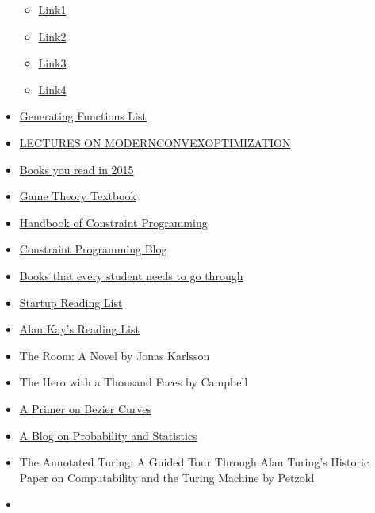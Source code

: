 \begin{itemize}
  \begin{itemize}
  \item
    \href{http://bartoszmilewski.com/2015/05/11/using-monads-in-c-to-solve-constraints-1-the-list-monad/}{Link1}
  \item
    \href{http://blog.jle.im/entry/unique-sample-drawing-searches-with-list-and-statet}{Link2}
  \item
    \href{http://www.berniepope.id.au/docs/scala_monads.pdf}{Link3}
  \item
    \href{http://james-iry.blogspot.co.at/2007/10/monads-are-elephants-part-3.html}{Link4}
  \end{itemize}
\item
  \href{http://lacim.uqam.ca/~plouffe/articles/MasterThesis.pdf}{Generating
  Functions List}
\item
  \href{http://www2.isye.gatech.edu/~nemirovs/Lect_ModConvOpt.pdf}{LECTURES
  ON MODERNCONVEXOPTIMIZATION}
\item
  \href{https://news.ycombinator.com/item?id=10783219}{Books you read in
  2015}
\item
  \href{http://arxiv.org/abs/1512.06808}{Game Theory Textbook}
\item
  \href{http://cswww.essex.ac.uk/CSP/papers/CP_Handbook-20060315-final.pdf}{Handbook
  of Constraint Programming}
\item
  \href{http://www.hakank.org/constraint_programming_blog/}{Constraint
  Programming Blog}
\item
  \href{http://math.stackexchange.com/questions/94827/books-that-every-student-need\%20s-to-go-through}{Books
  that every student needs to go through}
\item
  \href{http://www.nicolabortignon.com/startup-reading-list/}{Startup
  Reading List}
\item
  \href{http://www.squeakland.org/resources/books/readingList.jsp}{Alan
  Kay's Reading List}
\item
  The Room: A Novel by Jonas Karlsson
\item
  The Hero with a Thousand Faces by Campbell
\item
  \href{https://pomax.github.io/bezierinfo/}{A Primer on Bezier Curves}
\item
  \href{https://probabilityandstats.wordpress.com/}{A Blog on
  Probability and Statistics}
\item
  The Annotated Turing: A Guided Tour Through Alan Turing's Historic
  Paper on Computability and the Turing Machine by Petzold
\item

\end{itemize}
